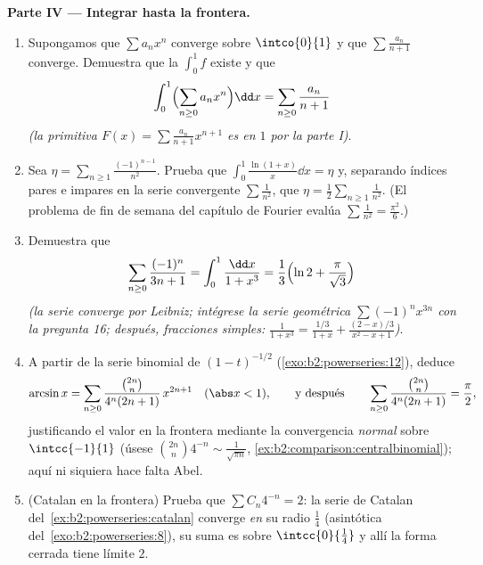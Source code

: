 \begin{problem}
\medskip
\noindent\textbf{Parte IV --- Integrar hasta la frontera.}
\begin{enumerate}[resume]
  \item Supongamos que $\sum a_nx^n$ converge sobre $\intco{0}{1}$ y
        que $\sum \frac{a_n}{n+1}$ converge. Demuestra que la
         $\int_0^1 f$ existe y que
        \[
        \int_0^1 \Bigl(\sum_{n\geq0} a_nx^n\Bigr)\dd x
        = \sum_{n\geq0}\frac{a_n}{n+1}
        \]
        \emph{(la primitiva $F(x) = \sum\frac{a_n}{n+1}x^{n+1}$ es
         en $1$ por la parte I)}.
  \item Sea $\eta = \sum_{n\geq1}\frac{(-1)^{n-1}}{n^2}$. Prueba que
        $\int_0^1 \frac{\ln(1+x)}{x}\dd x = \eta$ y, separando
        índices pares e impares en la serie 
        convergente $\sum \frac1{n^2}$, que $\eta =
        \frac12\sum_{n\geq1}\frac{1}{n^2}$. (El problema de fin de
        semana del capítulo de Fourier evalúa $\sum\frac1{n^2} =
        \frac{\pi^2}{6}$.)
  \item Demuestra que
        \[
        \sum_{n\geq0}\frac{(-1)^n}{3n+1}
        = \int_0^1\frac{\dd x}{1+x^3}
        = \frac13\Bigl(\ln 2 + \frac{\pi}{\sqrt3}\Bigr)
        \]
        \emph{(la serie converge por Leibniz; intégrese la serie
        geométrica $\sum(-1)^nx^{3n}$ con la pregunta 16; después,
        fracciones simples: $\frac{1}{1+x^3} = \frac{1/3}{1+x} +
        \frac{(2-x)/3}{x^2-x+1}$)}.
  \item A partir de la serie binomial de $(1-t)^{-1/2}$
        (\cref{exo:b2:powerseries:12}), deduce
        \[
        \arcsin x = \sum_{n\geq0}
        \frac{\binom{2n}{n}}{4^n(2n+1)}\,x^{2n+1}
        \quad(\abs x < 1),
        \qquad\text{y después}\qquad
        \sum_{n\geq0}\frac{\binom{2n}{n}}{4^n(2n+1)}
        = \frac\pi2 ,
        \]
        justificando el valor en la frontera mediante la
        convergencia \emph{normal} sobre $\intcc{-1}{1}$ (úsese
        $\binom{2n}n4^{-n} \sim \frac{1}{\sqrt{\pi n}}$,
        \cref{ex:b2:comparison:centralbinomial}); aquí ni siquiera
        hace falta Abel.
  \item (Catalan en la frontera) Prueba que $\sum C_n 4^{-n} = 2$:
        la serie de Catalan del~\cref{ex:b2:powerseries:catalan}
        converge \emph{en} su radio $\frac14$ (asintótica del~\cref{exo:b2:powerseries:8}), su suma es  sobre
        $\intcc{0}{\frac14}$ y allí la forma cerrada tiene límite
        $2$.
\end{enumerate}


\end{problem}
